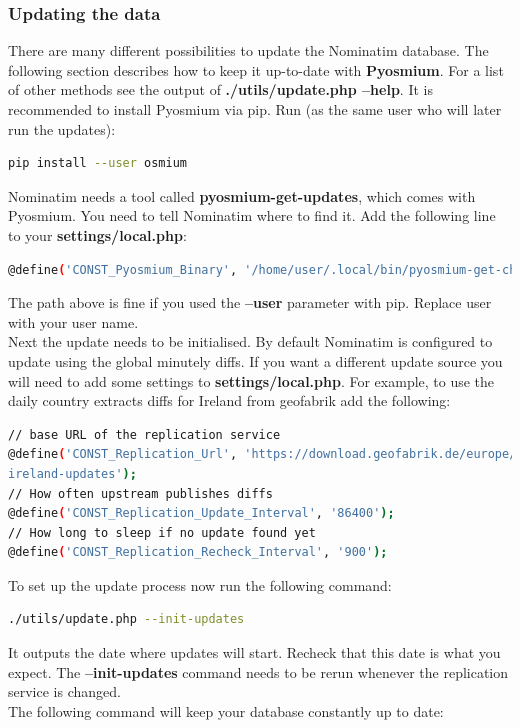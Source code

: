 \subsubsection{Updating the data}
There are many different possibilities to update the Nominatim database. The following section
describes how to keep it up-to-date with \textbf{Pyosmium}. For a list of other methods see the output of
\textbf{./utils/update.php --help}. It is recommended to install Pyosmium via pip. Run (as the same user who will later run the updates):
\begin{lstlisting}[language=bash,breaklines=true]
pip install --user osmium
\end{lstlisting}
Nominatim needs a tool called \textbf{pyosmium-get-updates}, which comes with Pyosmium. You need
to tell Nominatim where to find it. Add the following line to your \textbf{settings/local.php}:
\begin{lstlisting}[language=bash,breaklines=true]
@define('CONST_Pyosmium_Binary', '/home/user/.local/bin/pyosmium-get-changes');
\end{lstlisting}
The path above is fine if you used the \textbf{--user} parameter with pip. Replace user with your user
name. \\
Next the update needs to be initialised. By default Nominatim is configured to update using the
global minutely diffs. If you want a different update source you will need to add some settings to \textbf{settings/local.php}.
For example, to use the daily country extracts diffs for Ireland from geofabrik add the following:
\begin{lstlisting}[language=bash,breaklines=true]
// base URL of the replication service
@define('CONST_Replication_Url', 'https://download.geofabrik.de/europe/ireland-and-northern-
ireland-updates');
// How often upstream publishes diffs
@define('CONST_Replication_Update_Interval', '86400');
// How long to sleep if no update found yet
@define('CONST_Replication_Recheck_Interval', '900');
\end{lstlisting}
To set up the update process now run the following command:
\begin{lstlisting}[language=bash,breaklines=true]
./utils/update.php --init-updates
\end{lstlisting}
It outputs the date where updates will start. Recheck that this date is what you expect.
The \textbf{--init-updates} command needs to be rerun whenever the replication service is changed.\\
The following command will keep your database constantly up to date:
